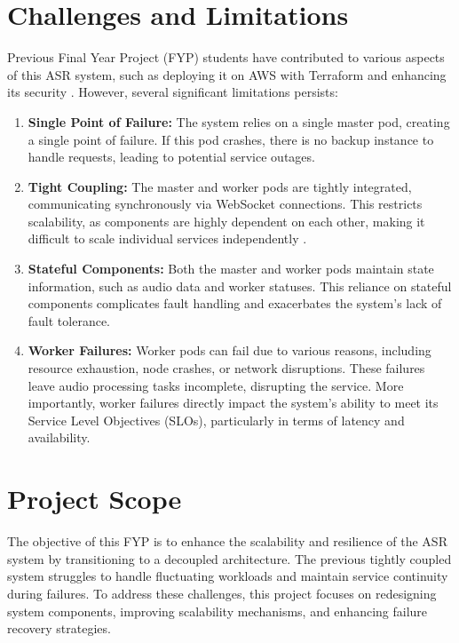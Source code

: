 \section{Challenges and Limitations}\label{section:challenges}
Previous Final Year Project (FYP) students have contributed to various aspects of this ASR system, such as deploying it on AWS with Terraform \cite{song_yu, kai_shern} and enhancing its security \cite{putra}. However, several significant limitations persists:
\begin{enumerate}
    \item \textbf{Single Point of Failure:} The system relies on a single master pod, creating a single point of failure. If this pod crashes, there is no backup instance to handle requests, leading to potential service outages.
    \item \textbf{Tight Coupling:} The master and worker pods are tightly integrated, communicating synchronously via WebSocket connections. This restricts scalability, as components are highly dependent on each other, making it difficult to scale individual services independently \cite{tight_couple}.
    \item \textbf{Stateful Components:} Both the master and worker pods maintain state information, such as audio data and worker statuses. This reliance on stateful components complicates fault handling and exacerbates the system's lack of fault tolerance.
    \item \textbf{Worker Failures:} Worker pods can fail due to various reasons, including resource exhaustion, node crashes, or network disruptions. These failures leave audio processing tasks incomplete, disrupting the service. More importantly, worker failures directly impact the system’s ability to meet its Service Level Objectives (SLOs), particularly in terms of latency and availability.
    
\end{enumerate}

\section{Project Scope}
The objective of this FYP is to enhance the scalability and resilience of the ASR system by transitioning to a decoupled architecture. The previous tightly coupled system struggles to handle fluctuating workloads and maintain service continuity during failures. To address these challenges, this project focuses on redesigning system components, improving scalability mechanisms, and enhancing failure recovery strategies.

